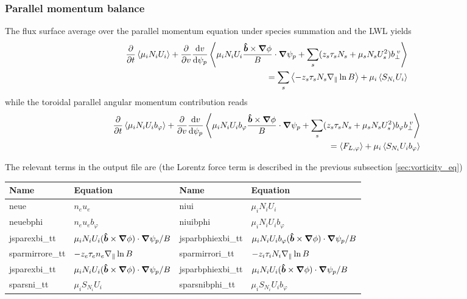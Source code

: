\subsubsection{Parallel momentum balance}
The flux surface average over the parallel momentum equation under species summation and the LWL yields
\begin{align}
  \frac{\partial}{\partial t}\left \langle \mu_iN_iU_{i}  \right \rangle
    + \frac{\partial}{\partial v} \frac{\mathrm{d} v}{\mathrm{d}\psi_p} \left \langle \mu_iN_iU_i \frac{\bm{\hat{b}}\times{\boldsymbol{\nabla}}\phi}{B}\cdot{\boldsymbol{\nabla}}\psi_p + \sum_s (z_s\tau_sN_s + \mu_s N_sU_s^2) b_{\perp}^{\;v}   \right \rangle
    \nonumber\\
   = \sum_s\left \langle -z_s\tau_s N_s\nabla_\parallel \ln B \right \rangle + \mu_i \left \langle  S_{N_i} U_i \right \rangle
   \label{eq:parallel_momentum}
\end{align}
while the toroidal parallel angular momentum contribution reads
\begin{align}\label{eq:parallel_momentum_direction}
    \frac{\partial}{\partial t}  \left \langle \mu_iN_iU_i b_\varphi \right \rangle
    + \frac{\partial}{\partial v} \frac{\mathrm{d} v}{\mathrm{d}\psi_p} \left \langle \mu_iN_iU_i b_\varphi\frac{\bm{\hat{b}}\times{\boldsymbol{\nabla}}\phi}{B}\cdot{\boldsymbol{\nabla}}\psi_p + \sum_s (z_s\tau_s N_s + \mu_sN_sU_s^2) b_\varphi b_{\perp}^{\;v}  \right \rangle
    \nonumber\\
   = \left \langle F_{L,\varphi} \right \rangle + \mu_i \left \langle  S_{N_i} U_i b_\varphi \right \rangle
\end{align}

The relevant terms in the output file are (the Lorentz force term is described in the previous subsection \ref{sec:vorticity_eq})
\begin{longtable}{llll}
\toprule
\rowcolor{gray!50}\textbf{Name} &  \textbf{Equation} &
\textbf{Name} &  \textbf{Equation}\\
\midrule
    neue &$n_e u_e$ &
    niui &$\mu_i N_i U_i$ \\
    neuebphi &$n_eu_eb_\varphi$ &
    niuibphi &$\mu_i N_iU_ib_\varphi$ \\
    jsparexbi\_tt       & $\mu_i N_iU_i(\bm{\hat{b}}\times{\boldsymbol{\nabla}}\phi)\cdot{\boldsymbol{\nabla}} \psi_p/B$ &
    jsparbphiexbi\_tt   & $\mu_i N_iU_ib_\varphi(\bm{\hat{b}}\times{\boldsymbol{\nabla}}\phi)\cdot{\boldsymbol{\nabla}} \psi_p/B$ \\
    sparmirrore\_tt & $-z_e\tau_en_e\nabla_\parallel \ln B$ &
    sparmirrori\_tt & $-z_i\tau_iN_i\nabla_\parallel \ln B$ \\
    jsparexbi\_tt       & $\mu_i N_iU_i(\bm{\hat{b}}\times{\boldsymbol{\nabla}}\phi)\cdot{\boldsymbol{\nabla}} \psi_p/B$ &
    jsparbphiexbi\_tt   & $\mu_i N_iU_i(\bm{\hat{b}}\times{\boldsymbol{\nabla}}\phi)\cdot{\boldsymbol{\nabla}} \psi_p/B$ \\
    sparsni\_tt & $\mu_i S_{N_i} U_i$ &
    sparsnibphi\_tt & $\mu_i S_{N_i} U_ib_\varphi $ \\
\bottomrule
\end{longtable}

